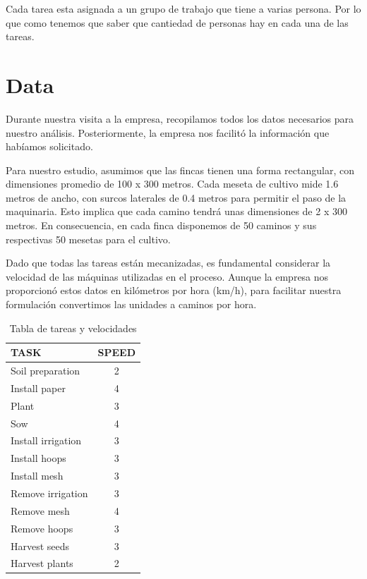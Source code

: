 Cada tarea esta asignada a un grupo de trabajo que tiene a varias persona. Por lo que como tenemos que saber que cantiedad de personas
hay en cada una de las tareas.
\begin{center}
    

\end{center}

\chapter*{Data}

Durante nuestra visita a la empresa, recopilamos todos los datos necesarios para nuestro análisis. 
Posteriormente, la empresa nos facilitó la información que habíamos solicitado.

Para nuestro estudio, asumimos que las fincas tienen una forma rectangular, con dimensiones promedio
 de 100 x 300 metros. Cada meseta de cultivo mide 1.6 metros de ancho, con surcos laterales de 0.4 metros
  para permitir el paso de la maquinaria. Esto implica que cada camino tendrá unas dimensiones de 2 x 300 metros.
   En consecuencia, en cada finca disponemos de 50 caminos y sus respectivas 50 mesetas para el cultivo.

Dado que todas las tareas están mecanizadas, es fundamental considerar la velocidad de las máquinas utilizadas en el
 proceso. Aunque la empresa nos proporcionó estos datos en kilómetros por hora (km/h), para facilitar nuestra formulación 
 convertimos las unidades a caminos por hora.
 
 \begin{table}[ht!]
    \centering
    \begin{tabular}{|l|c|}
        \hline
        \rowcolor{gray!30} \textbf{\textcolor{grey3}{TASK}} & \textbf{\textcolor{grey3}{SPEED}} \\ 
        \hline
        Soil preparation   & 2  \\ \hline
        Install paper      & 4  \\ \hline
        Plant              & 3  \\ \hline
        Sow                & 4  \\ \hline
        Install irrigation & 3  \\ \hline
        Install hoops      & 3  \\ \hline
        Install mesh       & 3  \\ \hline
        Remove irrigation  & 3  \\ \hline
        Remove mesh        & 4  \\ \hline
        Remove hoops       & 3  \\ \hline
        Harvest seeds      & 3  \\ \hline
        Harvest plants     & 2  \\ 
        \hline
    \end{tabular}
    \caption{Tabla de tareas y velocidades}
    \label{tab:tareas}
\end{table}


